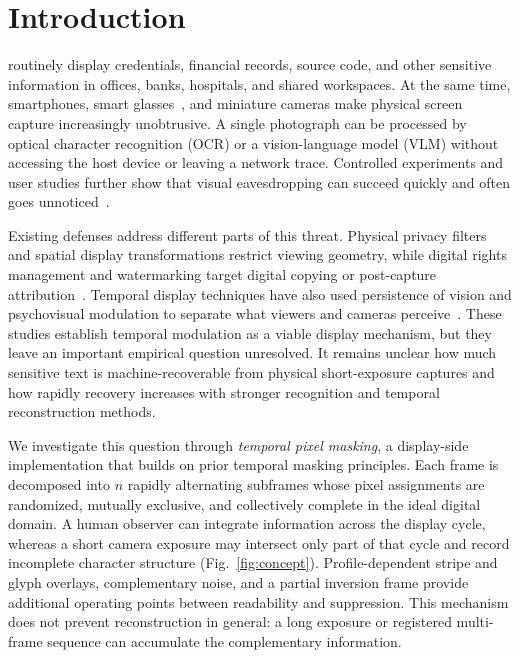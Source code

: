 \documentclass{ieeeaccess}
\begin{document}
\section{Introduction}

 routinely display credentials, financial records, source code, and other sensitive information in offices, banks, hospitals, and shared workspaces. At the same time, smartphones, smart glasses~\cite{b_wang2026}, and miniature cameras make physical screen capture increasingly unobtrusive. A single photograph can be processed by optical character recognition (OCR) or a vision-language model (VLM) without accessing the host device or leaving a network trace. Controlled experiments and user studies further show that visual eavesdropping can succeed quickly and often goes unnoticed~\cite{b_ponemon2016,b_eiband2017}.

Existing defenses address different parts of this threat. Physical privacy filters and spatial display transformations restrict viewing geometry, while digital rights management and watermarking target digital copying or post-capture attribution~\cite{b_hidescreen2019,b_fang2019}. Temporal display techniques have also used persistence of vision and psychovisual modulation to separate what viewers and cameras perceive~\cite{b_yerazunis2001,b_lim2007,b_wu2013,b_gao2014,b_kaleido2015}. These studies establish temporal modulation as a viable display mechanism, but they leave an important empirical question unresolved. It remains unclear how much sensitive text is machine-recoverable from physical short-exposure captures and how rapidly recovery increases with stronger recognition and temporal reconstruction methods.

We investigate this question through \emph{temporal pixel masking}, a display-side implementation that builds on prior temporal masking principles. Each frame is decomposed into $n$ rapidly alternating subframes whose pixel assignments are randomized, mutually exclusive, and collectively complete in the ideal digital domain. A human observer can integrate information across the display cycle, whereas a short camera exposure may intersect only part of that cycle and record incomplete character structure (Fig.~\ref{fig:concept}). Profile-dependent stripe and glyph overlays, complementary noise, and a partial inversion frame provide additional operating points between readability and suppression. This mechanism does not prevent reconstruction in general: a long exposure or registered multi-frame sequence can accumulate the complementary information.
\end{document}
